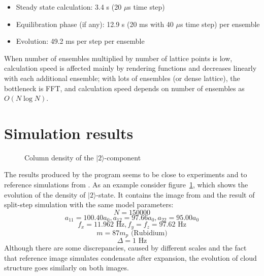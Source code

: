 \documentclass[12pt,notitlepage]{report}
\begin{document}
\begin{itemize}
\item Steady state calculation: 3.4 s (20 $\mu$s time step)
\item Equilibration phase (if any): 12.9 s (20 ms with 40 $\mu$s time step) per ensemble
\item Evolution: 49.2 ms per step per ensemble
\end{itemize}

When number of ensembles multiplied by number of lattice points is low, calculation speed is affected mainly by rendering functions and decreases linearly with each additional ensemble; with lots of ensembles (or dense lattice), the bottleneck is FFT, and calculation speed depends on number of ensembles as $O(N\log{N})$.

\section*{Simulation results}

\begin{figure}
\begin{center}
\qquad
{}
\end{center}
\caption{Column density of the $\vert2\rangle$-component}
\label{evolution_vs_reference}
\end{figure}

The results produced by the program seems to be close to experiments and to reference simulations from \cite{anderson-2009-80}. As an example consider figure~\ref{evolution_vs_reference}, which shows the evolution of the density of $\vert2\rangle$-state. It contains the image from \cite{anderson-2009-80} and the result of split-step simulation with the same model parameters:
\[ N = 150000 \]
\[ a_{11} = 100.40 a_0, a_{12} = 97.66 a_0, a_{22} = 95.00 a_0 \]
\[ f_x = 11.962 \textrm{ Hz}, f_y = f_z = 97.62 \textrm{ Hz} \]
\[ m = 87 m_p \textrm{ (Rubidium)}\]
\[ \Delta = 1 \textrm{ Hz} \]
Although there are some discrepancies, caused by different scales and the fact that reference image simulates condensate after expansion, the evolution of cloud structure goes similarly on both images.
\end{document}

